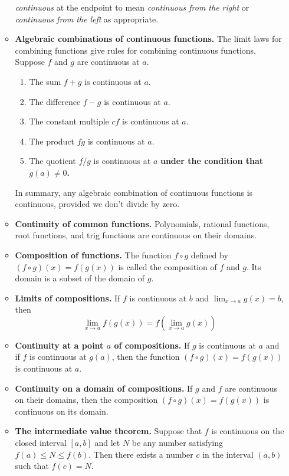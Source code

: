 \documentclass{article}
\newcommand{\ds}{\displaystyle}
\begin{document}
\begin{itemize}
\begin{itemize}
    \textit{continuous} at the endpoint to mean \textit{continuous from the
    right} or \textit{continuous from the left} as appropriate.
  \item \textbf{Algebraic combinations of continuous functions.}
    The limit laws for combining functions give rules for combining
    continuous functions.
    Suppose $f$ and $g$ are continuous at $a$.
    \begin{enumerate}
    \item The sum $f+g$ is continuous at $a$.
    \item The difference $f-g$ is continuous at $a$.
    \item The constant multiple $cf$ is continuous at $a$.
    \item The product $fg$ is continuous at $a$.
    \item The quotient $f/g$ is continuous at $a$ \textbf{under
      the condition that $g(a)\ne 0$.}
    \end{enumerate}
    In summary, any algebraic combination of continuous functions
    is continuous, provided we don't divide by zero.
  \item \textbf{Continuity of common functions.}  
    Polynomials, rational functions, root functions, and trig functions are 
    continuous on their domains.
  \item \textbf{Composition of functions.}
    The function $f\circ g$ defined by $(f\circ g)(x) = f(g(x))$ is called
    the composition of $f$ and $g$.  Its domain is a subset of the domain
    of $g$.
  \item \textbf{Limits of compositions.}
    If $f$ is continuous at $b$ and
    $\ds \lim_{x\to a} g(x) = b$, then
    \begin{displaymath}
      \lim_{x\to a} f(g(x)) = f(\lim_{x\to a} g(x))
    \end{displaymath}
  \item \textbf{Continuity at a point $a$ of compositions.}
    If $g$ is continuous at $a$ and if $f$ is continuous
    at $g(a)$, then the function
    $(f\circ g)(x) = f(g(x))$ is continuous at $a$.
  \item \textbf{Continuity on a domain of compositions.}
    If $g$ and $f$ are continuous on their domains,
    then the composition $(f\circ g)(x)=f(g(x))$ is continuous on its domain.
  \item \textbf{The intermediate value theorem.}
    Suppose that $f$ is continuous on the closed
    interval $[a,b]$ and let $N$ be any number satisfying $f(a)\le N\le f(b)$.
    Then there exists a number $c$ in the interval $(a,b)$ such that $f(c)=N$.
  \end{itemize}
\end{itemize}
\end{document}
